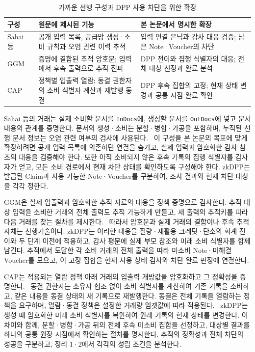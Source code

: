 \begin{table}[htbp]
\centering
\footnotesize
\setlength{\tabcolsep}{2pt}
\caption{가까운 선행 구성과 DPP 사용 차단을 위한 확장}
\label{tab:related-position}
\begin{tabularx}{\columnwidth}{@{}>{\raggedright\arraybackslash}p{13mm}YY@{}}
\toprule
구성 & 원문에 제시된 기능 & 본 논문에서 명시한 확장 \\
\midrule
Sahai 등~\cite{sahai-supply-chain-2020}
& 공개 입력 목록, 공급망 생성·소비 규칙과 오염 관련 이력 추적
& 입력 연결 은닉과 감사 대응 검증; 남은 Note·Voucher의 차단 \\
GGM~\cite{garman-accountable-privacy-2017}
& 증명에 결합된 추적 암호문; 입력에서 후속 출력으로 추적 전파
& DPP 전이와 집행 식별자의 대응; 전체 대상 선정과 완료 분석 \\
CAP~\cite{espresso-cap-spec-2022}
& 정책별 입출력 열람; 동결 권한자의 소비 식별자 계산과 재발행 동결
& DPP 후속 집합의 고정; 현재 상태 변경과 공통 시점 완료 확인 \\
\bottomrule
\end{tabularx}
\end{table}

Sahai 등의 거래는 실제 소비할 문서를 \texttt{InDocs}에,
생성할 문서를 \texttt{OutDocs}에 넣고 문서 내용의 관계를 증명한다.
문서의 생성·소비는 분할·병합·가공을 포함하며, 누적된 선행 문서
정보는 오염 관련 여부의 검사에 사용된다.~\cite[III·IV·V절]{sahai-supply-chain-2020}
이 구성을 본 논문의 목표에 맞게 확장하려면 공개 입력 목록에
의존하던 연결을 숨기고, 실제 입력과 암호화한 감사 참조의 대응을
검증해야 한다. 또한 아직 소비되지 않은 후속 기록의 집행 식별자를
감사자가 얻고, 모든 소비 경로에서 현재 차단 상태를 확인하도록
구성해야 한다. zkDPP는 발급된 Claim과 사용 가능한 Note·Voucher를
구분하여, 조사 결과와 현재 차단 대상을 각각 정한다.

GGM은 실제 입출력과 암호화한 추적 자료의 대응을 정책 증명으로
검사한다. 추적 대상 입력을 소비한 거래의 전체 출력도 추적 가능하게
만들고, 새 출력의 추적키를 따라 다음 거래를 찾는 절차를
제시한다.~\cite[4.5·5절, Algorithms 7·8]{garman-accountable-privacy-2017}
따라서 암호문과 실제 거래의 결합이나 후속 추적 자체는 선행기술이다.
zkDPP는 이러한 대응을 질량·재활용 크레딧·탄소의 회계 전이와
두 단계 이전에 적용하고, 감사 평문에 실제 부모 참조와 미래 소비
식별자를 함께 남긴다. 추적에서 도달한 각 소비 거래의 전체 출력을
따라 미소비 Note·미해결 Voucher를 모으고, 이 고정 집합을
현재 사용 상태 검사와 차단 완료 판정에 연결한다.

CAP는 적용되는 열람 정책 아래 거래의 입출력 개방값을 암호화하고
그 정확성을 증명한다.~\cite[2.2절, Remark 1]{espresso-cap-spec-2022}
동결 권한자는 소유자 협조 없이 소비 식별자를 계산하여 기존 기록을
소비하고, 같은 내용을 동결 상태의 새 기록으로 재발행한다.
동결은 전체 기록을 열람하는 정책을 요구하며, 열람·동결 정책은
설정한 거래량 임곗값에 따라 적용된다.~\cite[2.1·3.2.4절]{espresso-cap-spec-2022}
zkDPP는 생성 때 암호화한 미래 소비 식별자를 복원하여 원래 기록의
현재 상태를 변경한다. 이 차이와 함께, 분할·병합·가공 뒤의 전체
후속 미소비 집합을 선정하고, 대상별 결과를 하나의 공통 원장 시점에서
확인하는 절차를 명시한다. 추적의 정확성과 전체 차단의 성공을
구분하고, 정리 1·2에서 각각의 성립 조건을 분석한다.

